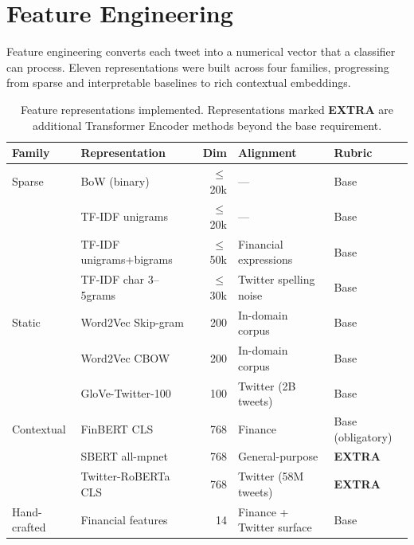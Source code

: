 \documentclass[11pt,a4paper]{article}
\begin{document}
\section{Feature Engineering}

Feature engineering converts each tweet into a numerical vector that a classifier can process.
Eleven representations were built across four families, progressing from sparse and interpretable
baselines to rich contextual embeddings.

\begin{table}[h]
\centering
\small
\begin{tabular}{llrll}
\toprule
\textbf{Family} & \textbf{Representation} & \textbf{Dim} & \textbf{Alignment} & \textbf{Rubric} \\
\midrule
Sparse  & BoW (binary)                  & $\leq$20k & —                        & Base \\
        & TF-IDF unigrams               & $\leq$20k & —                        & Base \\
        & TF-IDF unigrams+bigrams       & $\leq$50k & Financial expressions    & Base \\
        & TF-IDF char 3–5grams          & $\leq$30k & Twitter spelling noise   & Base \\
\midrule
Static  & Word2Vec Skip-gram            & 200       & In-domain corpus         & Base \\
        & Word2Vec CBOW                 & 200       & In-domain corpus         & Base \\
        & GloVe-Twitter-100             & 100       & Twitter (2B tweets)      & Base \\
\midrule
Contextual & FinBERT CLS               & 768       & Finance                  & Base (obligatory) \\
           & SBERT all-mpnet           & 768       & General-purpose          & \textbf{EXTRA} \\
           & Twitter-RoBERTa CLS       & 768       & Twitter (58M tweets)     & \textbf{EXTRA} \\
\midrule
Hand-crafted & Financial features      & 14        & Finance + Twitter surface & Base \\
\bottomrule
\end{tabular}
\caption{Feature representations implemented. Representations marked \textbf{EXTRA} are
additional Transformer Encoder methods beyond the base requirement.}
\label{tab:features}
\end{table}
\end{document}
